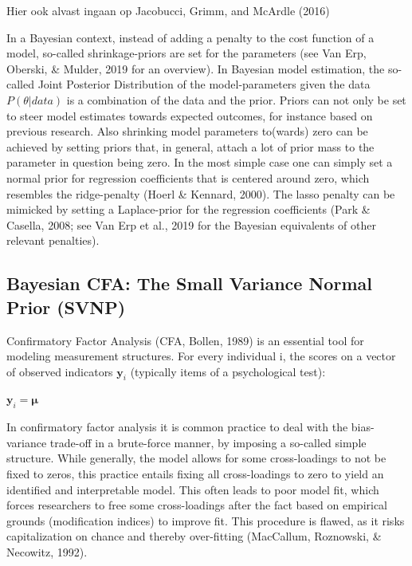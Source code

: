 \documentclass[
  man, donotrepeattitle,floatsintext]{apa6}
\begin{document}
Hier ook alvast ingaan op Jacobucci, Grimm, and McArdle (2016)

In a Bayesian context, instead of adding a penalty to the cost function of a model, so-called shrinkage-priors are set for the parameters (see Van Erp, Oberski, \& Mulder, 2019 for an overview). In Bayesian model estimation, the so-called Joint Posterior Distribution of the model-parameters given the data \(P({\theta} | data)\) is a combination of the data and the prior. Priors can not only be set to steer model estimates towards expected outcomes, for instance based on previous research. Also shrinking model parameters to(wards) zero can be achieved by setting priors that, in general, attach a lot of prior mass to the parameter in question being zero. In the most simple case one can simply set a normal prior for regression coefficients that is centered around zero, which resembles the ridge-penalty (Hoerl \& Kennard, 2000). The lasso penalty can be mimicked by setting a Laplace-prior for the regression coefficients (Park \& Casella, 2008; see Van Erp et al., 2019 for the Bayesian equivalents of other relevant penalties).

\hypertarget{bayesian-cfa-the-small-variance-normal-prior-svnp}{%
\subsection{Bayesian CFA: The Small Variance Normal Prior (SVNP)}\label{bayesian-cfa-the-small-variance-normal-prior-svnp}}

Confirmatory Factor Analysis (CFA, Bollen, 1989) is an essential tool for modeling measurement structures. For every individual i, the scores on a vector of observed indicators \(\mathbf{y}_i\) (typically items of a psychological test):

\(\mathbf{y}_i = \mathbf{\mu}\)

In confirmatory factor analysis it is common practice to deal with the bias-variance trade-off in a brute-force manner, by imposing a so-called simple structure. While generally, the model allows for some cross-loadings to not be fixed to zeros, this practice entails fixing all cross-loadings to zero to yield an identified and interpretable model. This often leads to poor model fit, which forces researchers to free some cross-loadings after the fact based on empirical grounds (modification indices) to improve fit. This procedure is flawed, as it risks capitalization on chance and thereby over-fitting (MacCallum, Roznowski, \& Necowitz, 1992).
\end{document}
